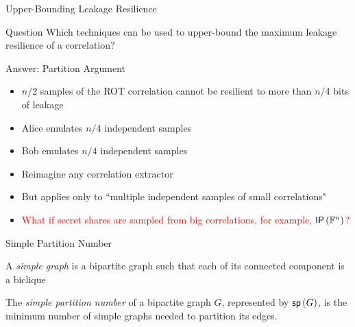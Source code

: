 \begin{frame}{Upper-Bounding Leakage Resilience}

{
	\begin{block}{Question}
		Which techniques can be used to upper-bound the maximum leakage resilience of a correlation?
	\end{block}
}
{
	\begin{block}{Answer: Partition Argument}
		\begin{itemize}
			\item $ n/2 $ samples of the ROT correlation cannot be resilient to more than $ n/4 $ bits of leakage
			\item Alice emulates $ n/4 $ independent samples
			\item Bob emulates $ n/4 $ independent samples
			\item Reimagine any correlation extractor
		\end{itemize}		
	\end{block}
}

\begin{itemize}
	\item But applies only to ``multiple independent samples of small correlations"
	\item \textcolor{red}{What if secret shares are sampled from big correlations, for example, $ \IP[\bbF^n] $?}
\end{itemize}

\end{frame}

\begin{frame}{Simple Partition Number}
	\begin{definition}
		A \textit{simple graph} is a bipartite graph such that each of its
		connected component is a biclique
	\end{definition}
	\pause
	\begin{definition}
		The \textit{simple partition number} of a bipartite graph $G$, represented
		by $\sp G$, is the minimum number of simple graphs needed to
		partition its edges.
	\end{definition}
	\pause
	
\end{frame}

